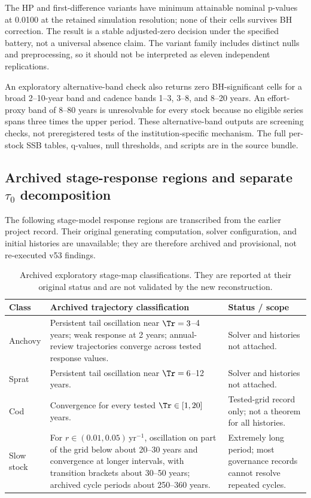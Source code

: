 The HP and first-difference variants have minimum attainable nominal p-values at 0.0100 at the retained simulation resolution; none of their cells survives BH correction. The result is a stable adjusted-zero decision under the specified battery, not a universal absence claim. The variant family includes distinct nulls and preprocessing, so it should not be interpreted as eleven independent replications.

An exploratory alternative-band check also returns zero BH-significant cells for a broad 2--10-year band and cadence bands 1--3, 3--8, and 8--20 years. An effort-proxy band of 8--80 years is unresolvable for every stock because no eligible series spans three times the upper period. These alternative-band outputs are screening checks, not preregistered tests of the institution-specific mechanism. The full per-stock SSB tables, q-values, null thresholds, and scripts are in the source bundle.

\subsection{Archived stage-response regions and separate \texorpdfstring{\(\tau_0\)}{tau0} decomposition}\label{si:legacy-stage}

The following stage-model response regions are transcribed from the earlier project record. Their original generating computation, solver configuration, and initial histories are unavailable; they are therefore archived and provisional, not re-executed v53 findings.

\begin{table}[htbp]
\centering\small
\caption{Archived exploratory stage-map classifications. They are reported at their original status and are not validated by the new reconstruction.}
\label{tab:legacy-stage-windows}
\begin{tabularx}{\linewidth}{@{}lXl@{}}
\toprule Class & Archived trajectory classification & Status / scope \\
\midrule
Anchovy & Persistent tail oscillation near \(\Tr=3\)--4 years; weak response at 2 years; annual-review trajectories converge across tested response values. & Solver and histories not attached. \\
Sprat & Persistent tail oscillation near \(\Tr=6\)--12 years. & Solver and histories not attached. \\
Cod & Convergence for every tested \(\Tr\in[1,20]\) years. & Tested-grid record only; not a theorem for all histories. \\
Slow stock & For \(r\in(0.01,0.05)\,\mathrm{yr}^{-1}\), oscillation on part of the grid below about 20--30 years and convergence at longer intervals, with transition brackets about 30--50 years; archived cycle periods about 250--360 years. & Extremely long period; most governance records cannot resolve repeated cycles. \\
\bottomrule
\end{tabularx}
\end{table}

